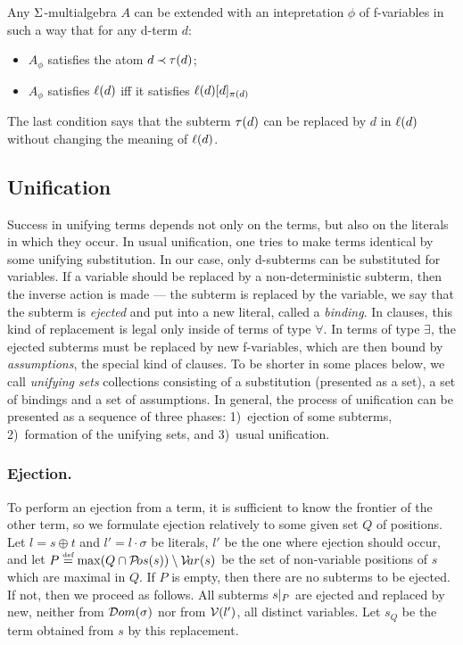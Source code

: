 \begin{LEMMA}\label{le:f-variables}
Any \(\Sigma\)-multialgebra $A$ can be extended with an intepretation $\phi$
of f-variables in such a way that for any d-term $d:$ 
\begin{itemize}%
\item $A_\phi$ satisfies the atom \(d\mathbin{\prec} \tau(d)\);
\item $A_\phi$ satisfies \(\ell(d)\) iff it satisfies \(\ell(d) [d]_{\pi(d)}\) 
\end{itemize}
 \end{LEMMA}
The last condition says that the subterm \(\tau(d)\) can be replaced by $d$ in
\(\ell(d)\) without changing the meaning of \(\ell(d)\). 

\subsection{Unification}

Success in unifying terms depends not only on the terms, but also on the literals 
in which
they occur.  In usual unification, one tries to make terms identical by
some unifying substitution.  In our case, only d-subterms can be substituted
for variables.  If a variable  should be replaced by a
non-deterministic subterm, then the inverse action is made --- the subterm is
replaced by the variable, we say that the subterm is {\em ejected} and put
into a new literal, called a {\em binding}.  In clauses, this kind of
replacement is legal only inside of terms of type $\forall$.  In terms of
type $\exists$, the ejected subterms must be replaced by new f-variables,
which are then bound by {\em assumptions}, the special kind of clauses.  To
be shorter in some places below, we call {\em unifying sets} collections
consisting of a substitution (presented as a set), a set of bindings and a
set of assumptions.  In general, the process of unification can be presented
as a sequence of three phases: 1)~ejection of some subterms, 2)~formation of
the unifying sets, and 3)~usual unification.
%
\subsubsection{Ejection.}
%
To perform an ejection from a term, it is sufficient to know the frontier of
the other term, so we formulate ejection relatively to some given set $Q$ of
positions.  Let \(l= s\oplus t\) and \(l'=l\cdot \sigma\) be literals, $l'$
be the one where ejection should occur, and let \(P \mathrel {\stackrel {\mbox {\tiny def}}{=}} \max(Q\cap{\sl{\cal P}\!os}(s))\setminus {\sl{\cal V}\!ar}(s)\) be the set of non-variable positions of $s$ which are
maximal in $Q$.  If $P$ is empty, then there are no subterms to be ejected.
If not, then we proceed as follows.  All subterms \(s|_{P}\) are ejected
and replaced by new, neither from \({\sl{\cal D}om} (\sigma)\) nor from \({\cal V}(l')\), all
distinct variables.  Let $s_Q$ be the term obtained from $s$ by this
replacement.

